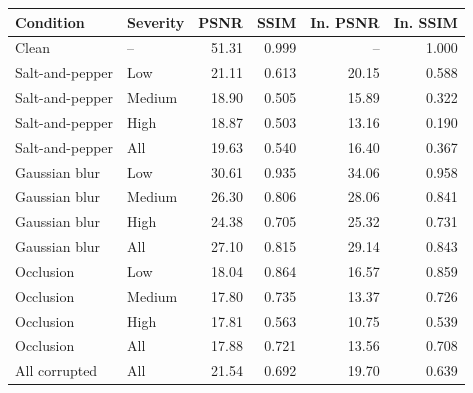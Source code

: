 \begin{tabular}{llrrrr}
\toprule
Condition & Severity & PSNR & SSIM & In. PSNR & In. SSIM \\
\midrule
Clean & -- & 51.31 & 0.999 & -- & 1.000 \\
\midrule
Salt-and-pepper & Low & 21.11 & 0.613 & 20.15 & 0.588 \\
Salt-and-pepper & Medium & 18.90 & 0.505 & 15.89 & 0.322 \\
Salt-and-pepper & High & 18.87 & 0.503 & 13.16 & 0.190 \\
Salt-and-pepper & All & 19.63 & 0.540 & 16.40 & 0.367 \\
\midrule
Gaussian blur & Low & 30.61 & 0.935 & 34.06 & 0.958 \\
Gaussian blur & Medium & 26.30 & 0.806 & 28.06 & 0.841 \\
Gaussian blur & High & 24.38 & 0.705 & 25.32 & 0.731 \\
Gaussian blur & All & 27.10 & 0.815 & 29.14 & 0.843 \\
\midrule
Occlusion & Low & 18.04 & 0.864 & 16.57 & 0.859 \\
Occlusion & Medium & 17.80 & 0.735 & 13.37 & 0.726 \\
Occlusion & High & 17.81 & 0.563 & 10.75 & 0.539 \\
Occlusion & All & 17.88 & 0.721 & 13.56 & 0.708 \\
\midrule
All corrupted & All & 21.54 & 0.692 & 19.70 & 0.639 \\
\bottomrule
\end{tabular}

